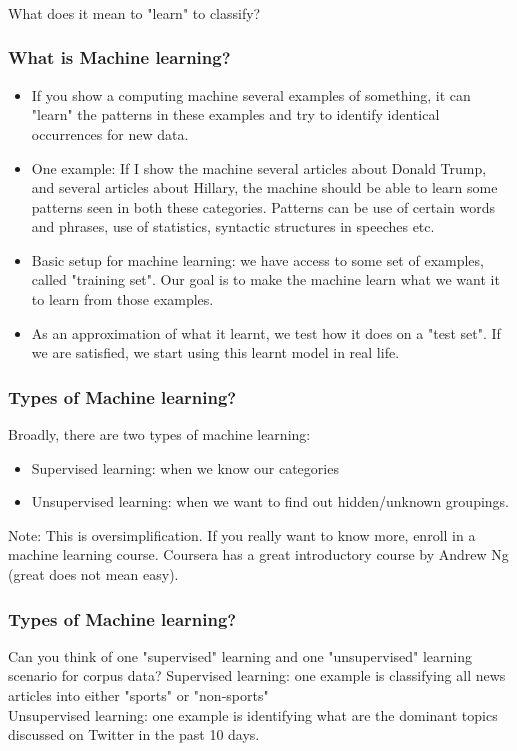 \documentclass{beamer}
\begin{document}
\begin{frame}
\frametitle{}
\begin{center}
\Large What does it mean to "learn" to classify?
\end{center}
\end{frame}

\begin{frame}
\frametitle{What is Machine learning?}
\begin{itemize}
\item If you show a computing machine several examples of something, it can "learn" the patterns in these examples and try to identify identical occurrences for new data. \pause
\item One example: If I show the machine several articles about Donald Trump, and several articles about Hillary, the machine should be able to learn some patterns seen in both these categories. Patterns can be use of certain words and phrases, use of statistics, syntactic structures in speeches etc. \pause
\item Basic setup for machine learning: we have access to some set of examples, called "training set". Our goal is to make the machine learn what we want it to learn from those examples. \pause
\item As an approximation of what it learnt, we test how it does on a "test set". If we are satisfied, we start using this learnt model in real life. 
\end{itemize}
\end{frame}

\begin{frame}
\frametitle{Types of Machine learning?}
Broadly, there are two types of machine learning:
\begin{itemize}
\item Supervised learning: when we know our categories
\item Unsupervised learning: when we want to find out hidden/unknown groupings.
\end{itemize}
Note: This is oversimplification. If you really want to know more, enroll in a machine learning course. Coursera has a great introductory course by Andrew Ng (great does not mean easy).
\end{frame}

\begin{frame}
\frametitle{Types of Machine learning?}
Can you think of one "supervised" learning and one "unsupervised" learning scenario for corpus data? 
\pause 
Supervised learning: one example is classifying all news articles into either "sports" or "non-sports" \\
Unsupervised learning: one example is identifying what are the dominant topics discussed on Twitter in the past 10 days. 
\end{frame}
\end{document}
